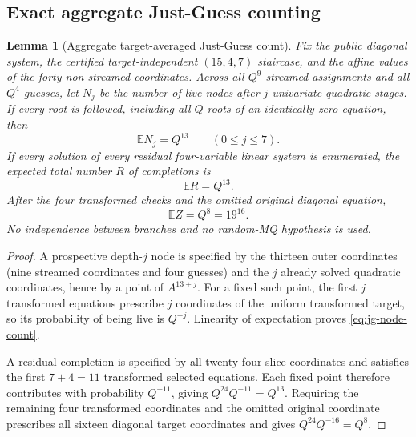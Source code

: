 \documentclass[11pt]{article}
\newtheorem{lemma}[theorem]{Lemma}
\begin{document}
\subsection{Exact aggregate Just-Guess counting}

\begin{lemma}[Aggregate target-averaged Just-Guess count]
\label{lem:jg-aggregate-count}
Fix the public diagonal system, the certified target-independent
$(15,4,7)$ staircase, and the affine values of the forty non-streamed
coordinates.  Across all $Q^9$ streamed assignments and all $Q^4$ guesses,
let $N_j$ be the number of live nodes after $j$ univariate quadratic stages.
If every root is followed, including all $Q$ roots of an identically zero
equation, then
\begin{equation}
  \mathbb E N_j=Q^{13}\qquad(0\le j\le7).            \label{eq:jg-node-count}
\end{equation}
If every solution of every residual four-variable linear system is enumerated,
the expected total number $R$ of completions is
\begin{equation}
  \mathbb E R=Q^{13}.                                \label{eq:jg-linear-count}
\end{equation}
After the four transformed checks and the omitted original diagonal equation,
\begin{equation}
  \mathbb E Z=Q^8=19^{16}.                           \label{eq:jg-Droot-count}
\end{equation}
No independence between branches and no random-MQ hypothesis is used.
\end{lemma}

\begin{proof}
A prospective depth-$j$ node is specified by the thirteen outer coordinates
(nine streamed coordinates and four guesses) and the $j$ already solved
quadratic coordinates, hence by a point of $A^{13+j}$.  For a fixed such
point, the first $j$ transformed equations prescribe $j$ coordinates of the
uniform transformed target, so its probability of being live is $Q^{-j}$.
Linearity of expectation proves \eqref{eq:jg-node-count}.

A residual completion is specified by all twenty-four slice coordinates and
satisfies the first $7+4=11$ transformed selected equations.  Each fixed point
therefore contributes with probability $Q^{-11}$, giving
$Q^{24}Q^{-11}=Q^{13}$.  Requiring the remaining four transformed coordinates
and the omitted original coordinate prescribes all sixteen diagonal target
coordinates and gives $Q^{24}Q^{-16}=Q^8$.
\end{proof}
\end{document}
